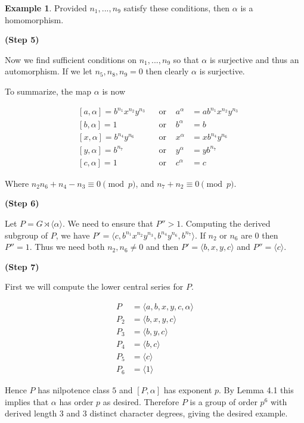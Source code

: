 \documentclass[]{amsart}
\theoremstyle{definition}
\theoremstyle{definition}
\theoremstyle{definition}
\newtheorem{ex}[theorem]{Example}
\theoremstyle{definition}
\theoremstyle{remark}
\theoremstyle{remark}
\begin{document}
\begin{ex}
            Provided $n_1,...,n_9$ satisfy these conditions, then $\alpha$ is a homomorphism.

            \textbf{(Step 5)}

            Now we find sufficient conditions on $n_1,...,n_9$ so that $\alpha$ is surjective and thus an automorphism. If we let $n_5,n_8,n_9=0$ then clearly $\alpha$ is surjective.

            To summarize, the map $\alpha$ is now

            \begin{align*}
                &[a,\alpha]=b^{n_1}x^{n_2}y^{n_3} &&\text{or } &a^\alpha&=ab^{n_1}x^{n_2}y^{n_3}\\
                &[b,\alpha]=1 &&\text{or } &b^\alpha&=b\\
                &[x,\alpha]=b^{n_4}y^{n_6} &&\text{or } &x^\alpha&=xb^{n_4}y^{n_6}\\
                &[y,\alpha]=b^{n_7} &&\text{or } &y^\alpha&=yb^{n_7}\\
                &[c,\alpha]=1 &&\text{or } &c^\alpha&=c
            \end{align*}

            Where $n_2n_6+n_4-n_3\equiv 0 \pmod{p}$, and $n_7+n_2\equiv 0 \pmod{p}$.

            \textbf{(Step 6)}

            Let $P=G\rtimes \langle \alpha \rangle$. We need to ensure that $P''>1$. Computing the derived subgroup of $P$, we have $P'=\langle c, b^{n_1}x^{n_2}y^{n_3}, b^{n_4}y^{n_6}, b^{n_7} \rangle$. If $n_2$ or $n_6$ are $0$ then $P''=1$. Thus we need both $n_2,n_6\neq 0$ and then $P'=\langle b,x,y,c \rangle$ and $P''=\langle c \rangle$. 

            \textbf{(Step 7)}

            First we will compute the lower central series for $P$. 

            \begin{align*}
                P&=\langle a,b,x,y,c,\alpha \rangle\\
                P_2&=\langle b,x,y,c \rangle\\
                P_3&=\langle b,y,c\rangle \\
                P_4&=\langle b,c\rangle\\
                P_5&=\langle c \rangle\\
                P_6&=\langle 1 \rangle
            \end{align*}

            Hence $P$ has nilpotence class $5$ and $[P,\alpha]$ has exponent $p$. By Lemma 4.1 this implies that $\alpha$ has order $p$ as desired. Therefore $P$ is a group of order $p^6$ with derived length 3 and 3 distinct character degrees, giving the desired example.
        \end{ex}
\end{document}
